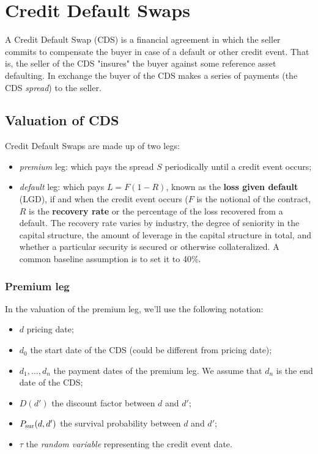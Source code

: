 \section{Credit Default Swaps}
\label{sec:credit-default-swaps}

A Credit Default Swap (CDS) is a financial agreement in which the seller commits to compensate the buyer in case of a default or other credit event. That is, the seller of the CDS "insures" the buyer against some reference asset defaulting. In exchange the buyer of the CDS makes a series of payments (the CDS \emph{spread}) to the seller.

\subsection{Valuation of CDS}
\label{sec:cds_valuation}

Credit Default Swaps are made up of two legs:

\begin{itemize}
\tightlist
\item \emph{premium} leg: which pays the spread $S$ periodically until a credit event occurs;
\item \emph{default} leg: which pays $L = F(1 - R)$, known as the \textbf{loss given default} (LGD), if and when the credit event occurs ($F$ is the notional of the contract, $R$ is the \textbf{recovery rate} or the percentage of the loss recovered from a default. The recovery rate varies by industry, the degree of seniority in the capital structure, the amount of leverage in the capital structure in total, and whether a particular security is secured or otherwise collateralized. A common baseline assumption is to set it to 40\%.
\end{itemize}

\subsubsection{Premium leg}\label{premium-leg}

In the valuation of the premium leg, we'll use the following notation:

\begin{itemize}
\tightlist
\item $d$ pricing date;
\item $d_0$ the start date of the CDS (could be different from pricing date);
\item $d_1, ..., d_n$ the payment dates of the premium leg. We assume that $d_n$ is the end date of the CDS;
\item $D(d')$ the discount factor between $d$ and $d'$;
\item $P_{\text{sur}}(d, d')$ the survival probability between $d$ and $d'$;
\item $\tau$ the \emph{random variable} representing the credit event date.
\end{itemize}

